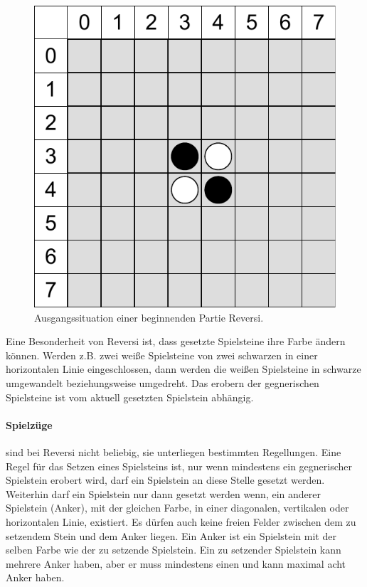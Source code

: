 \begin{figure}[!htbp]
  \centering
  \includegraphics[scale=0.5]{inhalt/abbildungen/ausgangssituation_reversi.pdf}
  \caption{Ausgangssituation einer beginnenden Partie Reversi.}
  \label{fig:ausgangssituation_reversi}
\end{figure}

Eine Besonderheit von Reversi ist, dass gesetzte Spielsteine ihre Farbe ändern können. Werden z.B. zwei weiße Spielsteine von zwei schwarzen in einer horizontalen Linie eingeschlossen, dann werden die weißen Spielsteine in schwarze umgewandelt beziehungsweise umgedreht. Das erobern der gegnerischen Spielsteine ist vom aktuell gesetzten Spielstein abhängig. 

\paragraph{Spielzüge} sind bei Reversi nicht beliebig, sie unterliegen bestimmten Regellungen. Eine Regel für das Setzen eines Spielsteins ist, nur wenn mindestens ein gegnerischer Spielstein erobert wird, darf ein Spielstein an diese Stelle gesetzt werden. Weiterhin  darf ein Spielstein nur dann gesetzt werden wenn, ein anderer Spielstein (Anker), mit der gleichen Farbe, in einer diagonalen, vertikalen oder horizontalen Linie, existiert. Es dürfen auch keine freien Felder zwischen dem zu setzendem Stein und dem Anker liegen. Ein Anker ist ein Spielstein mit der selben Farbe wie der zu setzende Spielstein. Ein zu setzender Spielstein kann mehrere Anker haben, aber er muss mindestens einen und kann maximal acht Anker haben.\\

